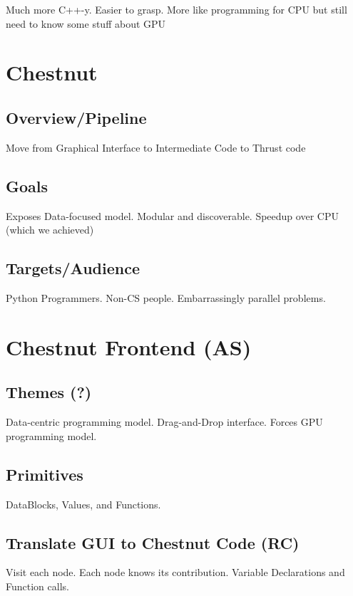 \documentclass{article}
\begin{document}
Much more C++-y. Easier to grasp. More like programming for CPU but still need to know some stuff about GPU

\section{Chestnut}

\subsection{Overview/Pipeline}

Move from Graphical Interface to Intermediate Code to Thrust code

\subsection{Goals}

Exposes Data-focused model. Modular and discoverable. Speedup over CPU (which we achieved)

\subsection{Targets/Audience}

Python Programmers. Non-CS people. Embarrassingly parallel problems.

\section{Chestnut Frontend (AS)}

\subsection{Themes (?)}

Data-centric programming model. Drag-and-Drop interface. Forces GPU programming model.

\subsection{Primitives}

DataBlocks, Values, and Functions.

\subsection{Translate GUI to Chestnut Code (RC)}

Visit each node. Each node knows its contribution. Variable Declarations and Function calls.
\end{document}

